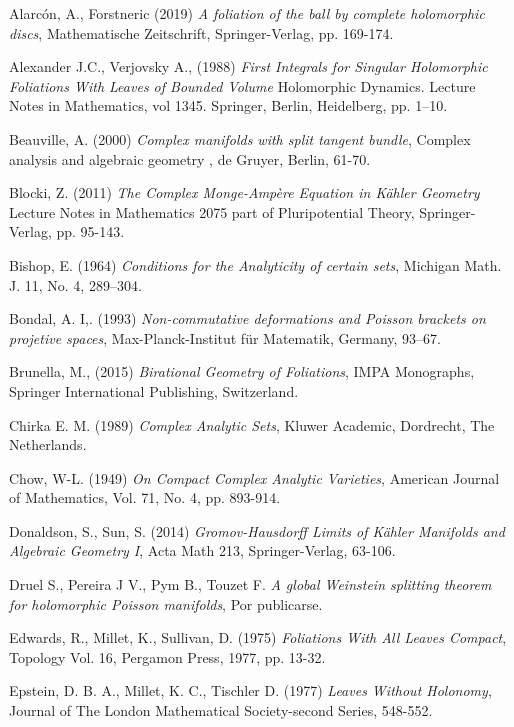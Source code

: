\documentclass{article}
\begin{document}
\begin{thebibliography}{3}

 Alarc\'on, A., Forstneric (2019) \textit{A foliation of the ball by complete holomorphic discs}, Mathematische Zeitschrift,
Springer-Verlag, pp. 169-174.

 Alexander J.C., Verjovsky A., (1988) \textit{First Integrals for Singular Holomorphic Foliations With Leaves of Bounded Volume}
Holomorphic Dynamics. Lecture Notes in Mathematics, vol 1345. Springer, Berlin, Heidelberg, pp. 1–10.

 Beauville, A. (2000) \textit{Complex manifolds with split tangent bundle}, Complex analysis and algebraic geometry
, de Gruyer, Berlin, 61-70.

 Blocki, Z. (2011) \textit{The Complex Monge-Amp\`ere Equation in K\"ahler Geometry} Lecture Notes in Mathematics 2075
part of Pluripotential Theory, Springer-Verlag, pp. 95-143.

 Bishop, E. (1964) \textit{Conditions for the Analyticity  of certain sets}, Michigan Math. J. 11, No. 4, 289--304. 

 Bondal, A. I,. (1993) \textit{Non-commutative deformations and Poisson brackets on projetive spaces}, 
Max-Planck-Institut f\"ur Matematik, Germany, 93–67.

 Brunella, M., (2015) \textit{Birational Geometry of Foliations}, IMPA Monographs, 
Springer International Publishing, Switzerland.

 Chirka E. M. (1989) \textit{Complex Analytic Sets}, Kluwer
Academic, Dordrecht, The Netherlands. 

 Chow, W-L. (1949) \textit{On Compact Complex Analytic Varieties},
American Journal of Mathematics, Vol. 71, No. 4, pp. 893-914.

 Donaldson, S., Sun, S. (2014) \textit{Gromov-Hausdorff Limits of K\"ahler Manifolds and Algebraic Geometry I},
 Acta Math 213, Springer-Verlag, 63-106.

Druel S., Pereira J V., Pym B., Touzet F. \textit{A global Weinstein splitting theorem for 
holomorphic Poisson manifolds}, Por publicarse.

 Edwards, R., Millet, K., Sullivan, D. (1975) \textit{Foliations
With All Leaves Compact}, Topology Vol. 16, Pergamon Press, 1977, pp. 13-32.

 Epstein, D. B. A., Millet, K. C., Tischler D.
(1977) \textit{Leaves Without Holonomy}, Journal of The London Mathematical Society-second Series, 548-552.


\end{thebibliography}
\end{document}
